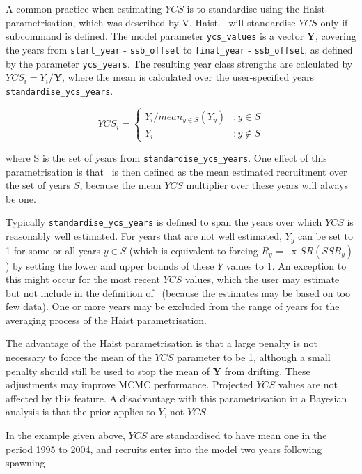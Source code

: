 A common practice when estimating $YCS$ is to standardise using the Haist parametrisation, which was described by V. Haist. \CNAME\ will standardise $YCS$ only if subcommand  is defined. The model parameter \texttt{ycs\_values} is a vector \textbf{Y}, covering the years from \texttt{start\_year} - \texttt{ssb\_offset} to \texttt{final\_year} - \texttt{ssb\_offset}, as defined by the parameter \texttt{ycs\_years}. The resulting year class strengths are calculated by $YCS_i=Y_i/\bar{\textbf{Y}}$, where the mean is calculated over the user-specified years \texttt{standardise\_ycs\_years}.

\[
YCS_i =
\begin{cases}
Y_i / mean_{y \in S}(Y_y) & :y \in S\\
Y_i					 & :y \notin S
\end{cases}
\]

where S is the set of years from \texttt{standardise\_ycs\_years}. One effect of this parametrisation is that \Rzero\ is then defined as the mean estimated recruitment over the set of years $S$, because the mean $YCS$ multiplier over these years will always be one.

Typically \texttt{standardise\_ycs\_years} is defined to span the years over which $YCS$ is reasonably well estimated. For years that are not well estimated, $Y_y$ can be set to 1 for some or all years $y\in S$ (which is equivalent to forcing $R_y$ = \Rzero\ x $SR(SSB_y)$) by setting the lower and upper bounds of these $Y$ values to 1. An exception to this might occur for the most recent $YCS$ values, which the user may estimate but not include in the definition of \Rzero\ (because the estimates may be based on too few data). One or more years may be excluded from the range of years for the averaging process of the Haist parametrisation.

The advantage of the Haist parametrisation is that a large penalty is not necessary to force the mean of the $YCS$ parameter to be 1, although a small penalty should still be used to stop the mean of \textbf{Y} from drifting. These adjustments may improve MCMC performance. Projected $YCS$ values are not affected by this feature. A disadvantage with this parametrisation in a Bayesian analysis is that the prior applies to $Y$, not $YCS$.

In the  example given above,  $YCS$ are standardised to have mean one in the period 1995 to 2004, and recruits enter into the model two years following spawning

